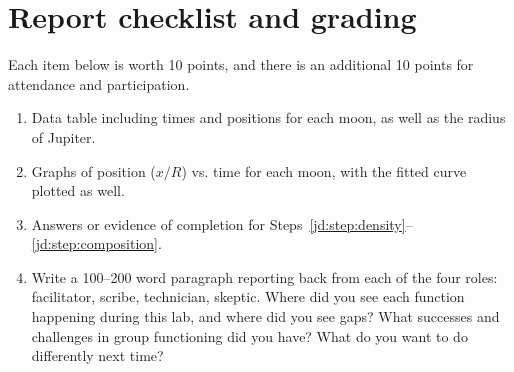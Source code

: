 \section{Report checklist and grading}

Each item below is worth 10 points, and there is an additional 10 points for attendance and participation.

\begin{enumerate}
	\item Data table including times and positions for each moon, as well as the radius of Jupiter.
	
	\item Graphs of position ($x/R$) vs. time for each moon, with the fitted curve plotted as well.
	
	\item Answers or evidence of completion for Steps~\ref{jd:step:density}--\ref{jd:step:composition}.
	
	\item Write a 100--200 word paragraph reporting back from each of the four roles: facilitator, scribe, technician, skeptic. Where did you see each function happening during this lab, and where did you see gaps? What successes and challenges in group functioning did you have? What do you want to do differently next time?
	
\end{enumerate}